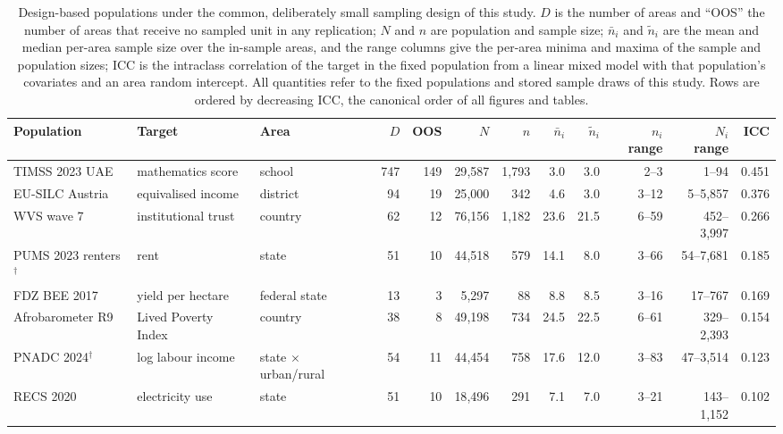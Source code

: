 \begin{table}[H]
\centering
\scriptsize
\setlength{\tabcolsep}{3.5pt}
\caption{Design-based populations under the common, deliberately small
sampling design of this study.
$D$ is the number of areas and ``OOS'' the number of areas that receive no
sampled unit in any replication; $N$ and $n$ are population and sample
size; $\bar n_i$ and $\tilde n_i$ are the mean and median per-area sample
size over the in-sample areas, and the range columns give the per-area
minima and maxima of the sample and population sizes; ICC is the intraclass
correlation of the
target in the fixed population from a linear mixed model with that
population's covariates and an area random intercept. All quantities refer
to the fixed populations and stored sample draws of this study. Rows
are ordered by decreasing ICC, the canonical order of all figures and
tables.}
\label{tab:datasets}
\begin{tabular}{@{}lllrrrrrrrrr@{}}
\toprule
Population & Target & Area & $D$ & OOS & $N$ & $n$ & $\bar n_i$ & $\tilde n_i$ & $n_i$ range & $N_i$ range & ICC \\
\midrule
TIMSS 2023 UAE \citep{mullis2024timss} & mathematics score & school & 747 & 149 & 29{,}587 & 1{,}793 & 3.0 & 3.0 & 2--3 & 1--94 & 0.451 \\
EU-SILC Austria \citep{kreutzmann2019emdi} & equivalised income & district & 94 & 19 & 25{,}000 & 342 & 4.6 & 3.0 & 3--12 & 5--5{,}857 & 0.376 \\
WVS wave 7 \citep{haerpfer2022wvs7} & institutional trust & country & 62 & 12 & 76{,}156 & 1{,}182 & 23.6 & 21.5 & 6--59 & 452--3{,}997 & 0.266 \\
PUMS 2023 renters$^{\dagger}$ \citep{census2024pums} & rent & state & 51 & 10 & 44{,}518 & 579 & 14.1 & 8.0 & 3--66 & 54--7{,}681 & 0.185 \\
FDZ BEE 2017 \citep{fdz_bee2017} & yield per hectare & federal state & 13 & 3 & 5{,}297 & 88 & 8.8 & 8.5 & 3--16 & 17--767 & 0.169 \\
Afrobarometer R9 \citep{afrobarometer2025r9} & Lived Poverty Index & country & 38 & 8 & 49{,}198 & 734 & 24.5 & 22.5 & 6--61 & 329--2{,}393 & 0.154 \\
PNADC 2024$^{\dagger}$ \citep{ibge2025pnadc} & log labour income & state $\times$ urban/rural & 54 & 11 & 44{,}454 & 758 & 17.6 & 12.0 & 3--83 & 47--3{,}514 & 0.123 \\
RECS 2020 \citep{eia2022recs} & electricity use & state & 51 & 10 & 18{,}496 & 291 & 7.1 & 7.0 & 3--21 & 143--1{,}152 & 0.102 \\

\end{tabular}
\end{table}
